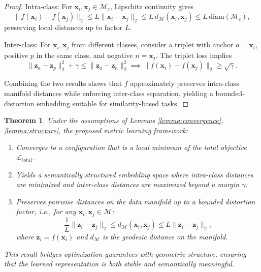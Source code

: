 \documentclass[a4paper,12pt,reqno]{amsart}
\newcommand{\revised}[1]{{\color{black}{#1}}}
\newtheorem{theorem}{\textbf{Theorem}}
\theoremstyle{definition}
\theoremstyle{remark}
\begin{document}
	\begin{proof}
	{Intra-class:} For $\mathbf{x}_i, \mathbf{x}_j \in \mathcal{M}_c$, Lipschitz continuity gives
		\[
		\|f(\mathbf{x}_i) - f(\mathbf{x}_j)\|_2 \le L \|\mathbf{x}_i - \mathbf{x}_j\|_2 \le L \, d_{\mathcal{M}}(\mathbf{x}_i, \mathbf{x}_j) \le L \, \text{diam}(\mathcal{M}_c),
		\]
		preserving local distances up to factor $L$.  
		
	{Inter-class:} For $\mathbf{x}_i, \mathbf{x}_j$ from different classes, consider a triplet with anchor $a = \mathbf{x}_i$, positive $p$ in the same class, and negative $n = \mathbf{x}_j$. The triplet loss implies
		\[
		\|\mathbf{z}_a - \mathbf{z}_p\|_2^2 + \gamma \le \|\mathbf{z}_a - \mathbf{z}_n\|_2^2 \implies \|f(\mathbf{x}_i) - f(\mathbf{x}_j)\|_2 \ge \sqrt{\gamma}.
		\]
		
		Combining the two results shows that $f$ approximately preserves intra-class manifold distances while enforcing inter-class separation, yielding a bounded-distortion embedding suitable for similarity-based tasks.
	\end{proof}
\begin{theorem}
Under the assumptions of Lemmas \ref{lemma:convergence}, \ref{lemma:structure}, 	\revised{and \ref{lemma:metric},} the proposed metric learning framework:
	
	\begin{enumerate}
		\item Converges to a configuration that is a local minimum of the total objective $\mathcal{L}_{\text{total}}$.
		\item Yields a semantically structured embedding space where intra-class distances are minimized and inter-class distances are maximized beyond a margin $\gamma$.
	\item Preserves pairwise distances on the data manifold up to a bounded distortion factor, i.e., for any $\mathbf{x}_i, \mathbf{x}_j \in \mathcal{M}$:
			\begin{equation}
				\frac{1}{L} \|\mathbf{z}_i - \mathbf{z}_j\|_2 \le d_\mathcal{M}(\mathbf{x}_i, \mathbf{x}_j) \le L \|\mathbf{z}_i - \mathbf{z}_j\|_2,
			\end{equation}
			where $\mathbf{z}_i = f(\mathbf{x}_i)$ and $d_\mathcal{M}$ is the geodesic distance on the manifold.
	\end{enumerate}
	This result bridges optimization guarantees with geometric structure, ensuring that the learned representation is both stable and semantically meaningful.
\end{theorem}
\end{document}
